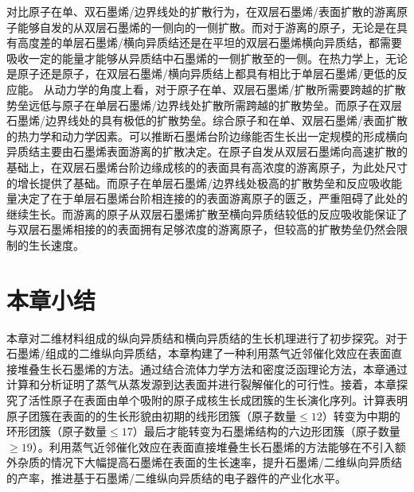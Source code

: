     对比原子在单、双石墨烯/边界线处的扩散行为，在双层石墨烯/表面扩散的游离原子能够自发的从双层石墨烯的一侧向的一侧扩散。而对于游离的原子，无论是在具有高度差的单层石墨烯/横向异质结还是在平坦的双层石墨烯横向异质结，都需要吸收一定的能量才能够从异质结中石墨烯的一侧扩散至的一侧。在热力学上，无论是原子还是原子，在双层石墨烯/横向异质结上都具有相比于单层石墨烯/更低的反应能。
    从动力学的角度上看，对于原子在单、双层石墨烯/扩散所需要跨越的扩散势垒远低与原子在单层石墨烯/边界线处扩散所需跨越的扩散势垒。而原子在双层石墨烯/边界线处的具有极低的扩散势垒。综合原子和在单、双层石墨烯/表面扩散的热力学和动力学因素。可以推断石墨烯台阶边缘能否生长出一定规模的形成横向异质结主要由石墨烯表面游离的扩散决定。在原子自发从双层石墨烯向高速扩散的基础上，在双层石墨烯台阶边缘成核的的表面具有高浓度的游离原子，为此处尺寸的增长提供了基础。而原子在单层石墨烯/边界线处极高的扩散势垒和反应吸收能量决定了在于单层石墨烯台阶相连接的的表面游离原子的匮乏，严重阻碍了此处的继续生长。而游离的原子从双层石墨烯扩散至横向异质结较低的反应吸收能保证了与双层石墨烯相接的的表面拥有足够浓度的游离原子，但较高的扩散势垒仍然会限制的生长速度。
    
\section{本章小结}
    本章对二维材料组成的纵向异质结和横向异质结的生长机理进行了初步探究。对于石墨烯/组成的二维纵向异质结，本章构建了一种利用蒸气近邻催化效应在表面直接堆叠生长石墨烯的方法。通过结合流体力学方法和密度泛函理论方法，本章通过计算和分析证明了蒸气从蒸发源到达表面并进行裂解催化的可行性。接着，本章探究了活性原子在表面由单个吸附的原子成核生长成团簇的生长演化序列。计算表明原子团簇在表面的的生长形貌由初期的线形团簇（原子数量$\leqslant 12$）转变为中期的环形团簇（原子数量$\leqslant 17$）最后才能转变为石墨烯结构的六边形团簇（原子数量 $\geqslant 19$）。利用蒸气近邻催化效应在表面直接堆叠生长石墨烯的方法能够在不引入额外杂质的情况下大幅提高石墨烯在表面的生长速率，提升石墨烯/二维纵向异质结的产率，推进基于石墨烯/二维纵向异质结的电子器件的产业化水平。

